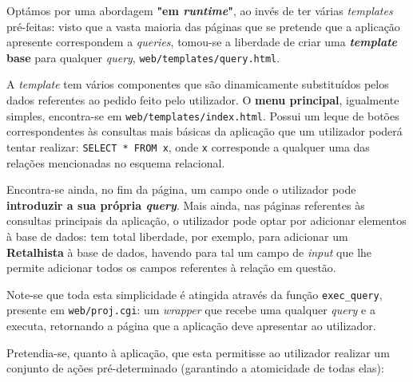 \documentclass[12pt,a4paper]{article}
\begin{document}
  Optámos por uma abordagem \textbf{"em \textit{runtime}"}, ao invés de ter várias \textit{templates}
  pré-feitas: visto que a vasta maioria das páginas que se pretende que a aplicação
  apresente correspondem a \textit{queries}, tomou-se a liberdade de criar uma
  \textbf{\textit{template} base} para qualquer \textit{query}, \texttt{web/templates/query.html}.
  
  A \textit{template} tem vários componentes que são dinamicamente substituídos
  pelos dados referentes ao pedido feito pelo utilizador. O \textbf{menu principal},
  igualmente simples, encontra-se em \texttt{web/templates/index.html}. Possui um
  leque de botões correspondentes às consultas mais básicas da aplicação que um
  utilizador poderá tentar realizar: \texttt{SELECT * FROM x}, onde \texttt{x} corresponde a qualquer
  uma das relações mencionadas no esquema relacional.
  
  Encontra-se ainda, no fim da página, um campo onde o utilizador pode \textbf{introduzir a sua própria \textit{query}}.
  Mais ainda, nas páginas referentes às consultas principais da aplicação,
  o utilizador pode optar por adicionar elementos à base de dados: tem total
  liberdade, por exemplo, para adicionar um \textbf{Retalhista} à base de dados,
  havendo para tal um campo de \textit{input} que lhe permite adicionar todos os
  campos referentes à relação em questão.

  Note-se que toda esta simplicidade é atingida através da função \texttt{exec\_query},
  presente em \texttt{web/proj.cgi}: um \textit{wrapper} que recebe uma qualquer
  \textit{query} e a executa, retornando a página que a aplicação deve apresentar
  ao utilizador.

  \vspace*{0.5cm}

  Pretendia-se, quanto à aplicação, que esta permitisse ao utilizador realizar um conjunto
  de ações pré-determinado (garantindo a atomicidade de todas elas):
\end{document}
